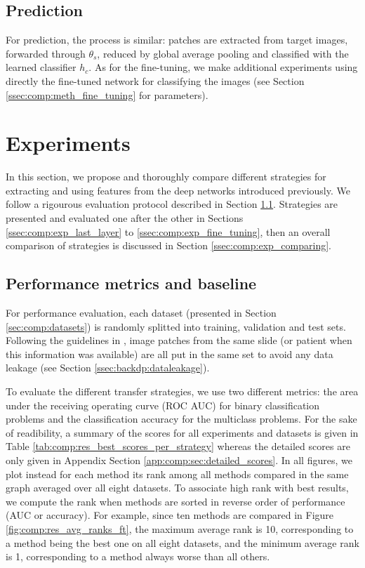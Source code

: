 \subsection{Prediction}
\label{ssec:comp:prediction}
For prediction, the process is similar: patches are extracted from target images, forwarded through $\theta_s$, reduced by global average pooling and classified with the learned classifier $h_c$. As for the fine-tuning, we make additional experiments using directly the fine-tuned network for classifying the images (see Section \ref{ssec:comp:meth_fine_tuning} for parameters).

\section{Experiments}
\label{sec:comp:experiments}

In this section, we propose and thoroughly compare different strategies for extracting and using features from the deep networks introduced previously. We follow a rigourous evaluation protocol described in Section \ref{ssec:comp:protocol}. Strategies are presented and evaluated one after the other in Sections \ref{ssec:comp:exp_last_layer} to \ref{ssec:comp:exp_fine_tuning}, then an overall comparison of strategies is discussed in Section \ref{ssec:comp:exp_comparing}.


\subsection{Performance metrics and baseline}
\label{ssec:comp:protocol}
For performance evaluation, each dataset (presented in Section \ref{sec:comp:datasets}) is randomly splitted into training, validation and test sets. Following the guidelines in \cite{maree2017need}, image patches from the same slide (or patient when this information was available) are all put in the same set to avoid any data leakage (see Section \ref{ssec:backdp:dataleakage}). %

To evaluate the different transfer strategies, we use two different metrics: the area under the receiving operating curve (ROC AUC) for binary classification problems and the classification accuracy for the multiclass problems. For the sake of readibility, a summary of the scores for all experiments and datasets is given in Table \ref{tab:comp:res_best_scores_per_strategy} whereas the detailed scores are only given in Appendix Section \ref{app:comp:sec:detailed_scores}. In all figures, we plot instead for each method its rank among all methods compared in the same graph averaged over all eight datasets. To associate high rank with best results, we compute the rank when methods are sorted in reverse order of performance (AUC or accuracy). For example, since ten methods are compared in Figure \ref{fig:comp:res_avg_ranks_ft}, the maximum average rank is 10, corresponding to a method being the best one on all eight datasets, and the minimum average rank is 1, corresponding to a method always worse than all others.

